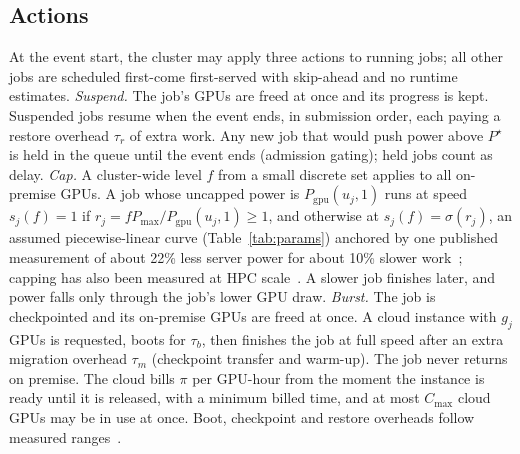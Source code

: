 \subsection{Actions}
At the event start, the cluster may apply three actions to running jobs; all other jobs are scheduled first-come first-served with skip-ahead and no runtime estimates.
\emph{Suspend.} The job's GPUs are freed at once and its progress is kept. Suspended jobs resume when the event ends, in submission order, each paying a restore overhead $\tau_r$ of extra work. Any new job that would push power above $P^\star$ is held in the queue until the event ends (admission gating); held jobs count as delay.
\emph{Cap.} A cluster-wide level $f$ from a small discrete set applies to all on-premise GPUs. A job whose uncapped power is $P_{\text{gpu}}(u_j,1)$ runs at speed $s_j(f)=1$ if $r_j=fP_{\max}/P_{\text{gpu}}(u_j,1)\ge 1$, and otherwise at $s_j(f)=\sigma(r_j)$, an assumed piecewise-linear curve (Table~\ref{tab:params}) anchored by one published measurement of about 22\% less server power for about 10\% slower work~\cite{patel24}; capping has also been measured at HPC scale~\cite{zhao23}. A slower job finishes later, and power falls only through the job's lower GPU draw.
\emph{Burst.} The job is checkpointed and its on-premise GPUs are freed at once. A cloud instance with $g_j$ GPUs is requested, boots for $\tau_b$, then finishes the job at full speed after an extra migration overhead $\tau_m$ (checkpoint transfer and warm-up). The job never returns on premise. The cloud bills $\pi$ per GPU-hour from the moment the instance is ready until it is released, with a minimum billed time, and at most $C_{\max}$ cloud GPUs may be in use at once. Boot, checkpoint and restore overheads follow measured ranges~\cite{mao12,mohan21}.

